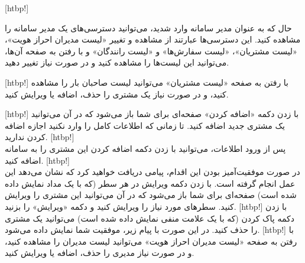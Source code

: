     [htbp!]

             حال که به عنوان مدیر سامانه وارد شدید، می‌توانید دسترسی‌های یک مدیر سامانه را مشاهده کنید. این دسترسی‌ها عبارتند از مشاهده و تغییر «لیست مدیران احراز هویت»، «لیست مشتریان»، «لیست سفارش‌ها» و «لیست رانندگان» و با رفتن به صفحه آن‌ها، می‌توانید این لیست‌ها را مشاهده کنید و در صورت نیاز تغییر دهید.

    [htbp!]
     با رفتن به صفحه «لیست مشتریان» می‌توانید لیست صاحبان بار را مشاهده کنید، و در صورت نیاز یک مشتری را حذف، اضافه یا ویرایش کنید.

    [htbp!]
\newpage
         با زدن دکمه «اضافه کردن» صفحه‌ای برای شما باز می‌شود که در آن می‌توانید یک مشتری جدید اضافه کنید. تا زمانی که اطلاعات کامل را وارد نکنید اجازه اضافه کردن ندارید.
[htbp!]
\\
پس از ورود اطلاعات، می‌توانید با زدن دکمه اضافه کردن این مشتری را به سامانه اضافه کنید.
[htbp!]
\\
در صورت موفقیت‌آمیز بودن این اقدام، پیامی دریافت خواهید کرد که نشان می‌دهد این عمل انجام گرفته است.
 با زدن دکمه ویرایش در هر سطر (که با یک مداد نمایش داده شده است) صفحه‌ای برای شما باز می‌شود که در آن می‌توانید این مشتری را ویرایش کنید. سطرهای مورد نیاز را ویرایش کنید و دکمه «ویرایش» را بزنید.
[htbp!]
     با زدن دکمه پاک کردن (که با یک علامت منفی نمایش داده شده است) می‌توانید یک مشتری را حذف کنید. در این صورت با پیام زیر، موفقیت شما نمایش داده می‌شود.
[htbp!]
             با رفتن به صفحه «لیست مدیران احراز هویت» می‌توانید لیست مدیران را مشاهده کنید، و در صورت نیاز مدیری را حذف، اضافه یا ویرایش کنید.

